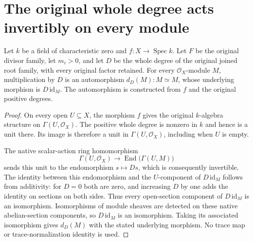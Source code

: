 \section{The original whole degree acts invertibly on every module}

\begin{theorem}
\label{thm:kn-nadel-whole-degree-scalar-isomorphism}
\leanok
Let $k$ be a field of characteristic zero and $f:X\to\operatorname{Spec}k$.
Let $F$ be the original divisor family, let $m_i>0$, and let $D$ be the
whole degree of the original joined root family, with every original
factor retained. For every $\mathcal O_X$-module $M$, multiplication by $D$
is an automorphism $d_D(M):M\simeq M$, whose underlying morphism is
$D\,\mathrm{id}_M$. The automorphism is constructed from $f$ and the
original positive degrees.
\end{theorem}
\begin{proof}
On every open $U\subseteq X$, the morphism $f$ gives the original
$k$-algebra structure on $\Gamma(U,\mathcal O_X)$. The positive whole
degree is nonzero in $k$ and hence is a unit there. Its image is therefore
a unit in $\Gamma(U,\mathcal O_X)$, including when $U$ is empty.

The native scalar-action ring homomorphism
\[
 \Gamma(U,\mathcal O_X)\longrightarrow
 \operatorname{End}\bigl(\Gamma(U,M)\bigr)
\]
sends this unit to the endomorphism $s\mapsto Ds$, which is consequently
invertible. The identity between this endomorphism and the $U$-component
of $D\,\mathrm{id}_M$ follows from additivity: for $D=0$ both are zero,
and increasing $D$ by one adds the identity on sections on both sides.
Thus every open-section component of $D\,\mathrm{id}_M$ is an
isomorphism. Isomorphisms of module sheaves are detected on these native
abelian-section components, so $D\,\mathrm{id}_M$ is an isomorphism.
Taking its associated isomorphism gives $d_D(M)$ with the stated
underlying morphism. No trace map or trace-normalization identity is
used.
\end{proof}
